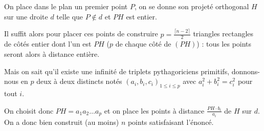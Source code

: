 On place dans le plan un premier point $P$, on se donne son projeté orthogonal $H$ sur une droite $d$ telle que $P\notin d$ et $PH$ est entier.

Il suffit alors pour placer ces points de construire $p=\frac{\lceil n-2\rceil}2$ triangles rectangles de côtés entier dont l'un est $PH$ ($p$ de chaque côté de $(PH)$) : tous les points seront alors à distance entière.

Mais on sait qu'il existe une infinité de triplets pythagoriciens primitifs, donnons-nous en $p$ deux à deux distincts notés $(a_i,b_i,c_i)_{1\le i\le p}$ avec $a_i^2+b_i^2=c_i^2$ pour tout $i$.

On choisit donc $PH=a_1a_2\ldots a_p$ et on place les points à distance $\frac{PH\cdot b_i}{a_i}$ de $H$ sur $d$. On a donc bien construit (au moins) $n$ points satisfaisant l'énoncé.